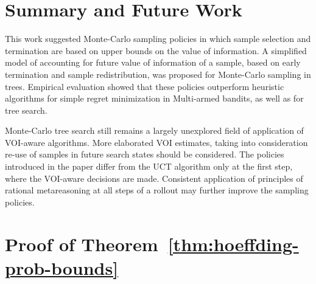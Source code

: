 \documentclass{article}
\begin{document}
\section{Summary and Future Work}

This work suggested Monte-Carlo sampling policies in which sample
selection and termination are based on upper bounds on the value of
information. A simplified model of accounting for future value of
information of a sample, based on early termination and sample
redistribution, was proposed for Monte-Carlo sampling in
trees. Empirical evaluation showed that these policies outperform
heuristic algorithms for simple regret minimization in Multi-armed
bandits, as well as for tree search.

Monte-Carlo tree search still remains a largely unexplored field of
application of VOI-aware algorithms. More elaborated VOI estimates,
taking into consideration re-use of samples in future search states
should be considered. The policies introduced in the paper differ from
the UCT algorithm only at the first step, where the VOI-aware
decisions are made. Consistent application of principles of rational
metareasoning at all steps of a rollout may further improve the
sampling policies.

\section{Proof of Theorem~\ref{thm:hoeffding-prob-bounds}}
\label{app:hoeffding-prob-bounds-proof}
\end{document}
